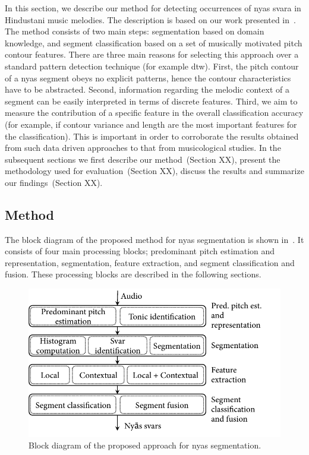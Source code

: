 {In this section, we describe our method for detecting occurrences of \gls{nyas} \gls{svara} in Hindustani music melodies. The description is based on our work presented in~\cite{gulati2014Landmark}. The method consists of two main steps: segmentation based on domain knowledge, and segment classification based on a set of musically motivated pitch contour features. There are three main reasons for selecting this approach over a standard pattern detection technique (for example \gls{dtw}). First, the pitch contour of a \gls{nyas} segment obeys no explicit patterns, hence the contour characteristics have to be abstracted. Second, information regarding the melodic context of a segment can be easily interpreted in terms of discrete features. Third, we aim to measure the contribution of a specific feature in the overall classification accuracy (for example, if contour variance and length are the most important features for the classification). This is important in order to corroborate the results obtained from such data driven approaches to that from musicological studies. In the subsequent sections we first describe our method~(Section XX), present the methodology used for evaluation~(Section XX), discuss the results and summarize our findings~(Section XX).

\subsection{Method}
\label{sec:pre_processing_nyas_id_method}

The block diagram of the proposed method for \gls{nyas} segmentation is shown in~. It consists of four main processing blocks; predominant pitch estimation and representation, segmentation, feature extraction, and segment classification and fusion. These processing blocks are described in the following sections.

\begin{figure}
	\begin{center}
		\includegraphics[width=\figSizeEightyFive]{ch05_preprocessing/figures/BlockDiagramNyasSegmentation.pdf}
	\end{center}
	\caption{Block diagram of the proposed approach for \gls{nyas} segmentation.}
	\label{fig:bd_nyas_segmentation}
\end{figure}

}
